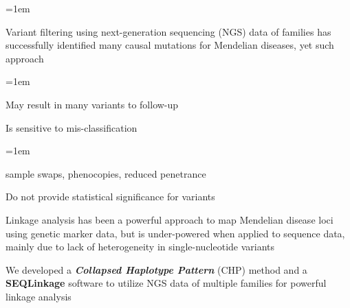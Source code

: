 \documentclass[ansiepaper, portrait, fontscale=0.35]{baposter} %
\newcommand{\cir}[1]{%
\tikz{\useasboundingbox (-0.2em,-0.32em) rectangle(0.2em,0.32em); \draw[draw=BaylorBurgundy,fill=BaylorBurgundy!#1!white,line width=0.03em] (0,0) circle(0.2em);}}
\newcommand{\tri}{\color{BaylorBurgundy}{$\triangleright$}}
\newcommand{\hf}[1]{{\color{BaylorBurgundy}\textbf{#1}}}
\newcommand{\clist}[1]{%
\begin{list}{\labelitemi}{\leftmargin=1em}
\setlength{\parindent}{5em}
\setlength{\itemsep}{0.2em}
\setlength{\parskip}{0em}
\setlength{\parsep}{0em}
#1
\end{list}
}
\begin{document}
\begin{poster}
   {
      \clist{
        \item[\cir{100}] Variant filtering using next-generation sequencing (NGS) data of families has successfully identified many causal mutations for Mendelian diseases, yet such approach 
        \clist{ 
          \item[\tri] May result in many variants to follow-up
          \item[\tri] Is sensitive to mis-classification
            \clist{
              \item[\tri] sample swaps, phenocopies, reduced penetrance
              }
          \item[\tri] Do not provide statistical significance for variants
        }
        \item[\cir{100}] Linkage analysis has been a powerful approach to map Mendelian disease loci using genetic marker data, but is under-powered when applied to sequence data, mainly due to lack of heterogeneity in single-nucleotide variants
        \item[\cir{100}] We developed a \hf{\textit{Collapsed Haplotype Pattern}} (CHP) method and a \hf{SEQLinkage} software to utilize NGS data of multiple families for powerful linkage analysis
      }
  }


\end{poster}
\end{document}
